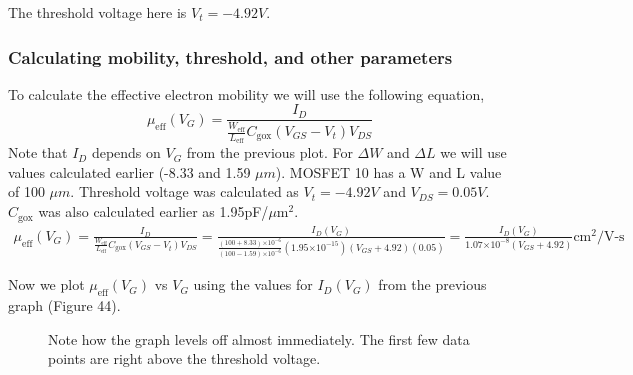\documentclass{article}
\providecommand{\e}[1]{\ensuremath{\times 10^{#1}}}
\begin{document}
The threshold voltage here is $V_t = -4.92 V$.

\subsubsection{Calculating mobility, threshold, and other parameters}
To calculate the effective electron mobility we will use the following equation,
\begin{equation}
\mu_{\text{eff}}(V_G) = \frac{I_D}{\frac{W_{\text{eff}}}{L_{\text{eff}}}C_{\text{gox}}(V_{GS} - V_t)V_{DS}}
\end{equation}
Note that $I_D$ depends on $V_{G}$ from the previous plot. For $\Delta W$ and $\Delta L$ we will use values calculated earlier (-8.33 and 1.59 $\mu m$). MOSFET 10 has a W and L value of 100 $\mu m$. Threshold voltage was calculated as $V_t = -4.92 V$ and $V_{DS} = 0.05 V$. $C_{\text{gox}}$ was also calculated earlier as 1.95pF/${\mu\text{m}}^{2}$.
\begin{align*}
\mu_{\text{eff}}(V_G) = \frac{I_D}{\frac{W_{\text{eff}}}{L_{\text{eff}}}C_{\text{gox}}(V_{GS} - V_t)V_{DS}} = \frac{I_D(V_G)}{\frac{(100 + 8.33)\e{-6}}{(100 - 1.59)\e{-6}}(1.95\e{-15})(V_{GS} + 4.92)(0.05)} = \frac{I_D(V_G)}{1.07\e{-8}(V_{GS} + 4.92)}{\text{cm}}^2/\text{V-s}
\end{align*}

Now we plot $\mu_{\text{eff}}(V_G)$ vs $V_G$ using the values for $I_D(V_G)$ from the previous graph (Figure 44).
\begin{figure}[H]
\centering
{}
\caption{Note how the graph levels off almost immediately. The first few data points are right above the threshold voltage.}
\end{figure}
\end{document}

